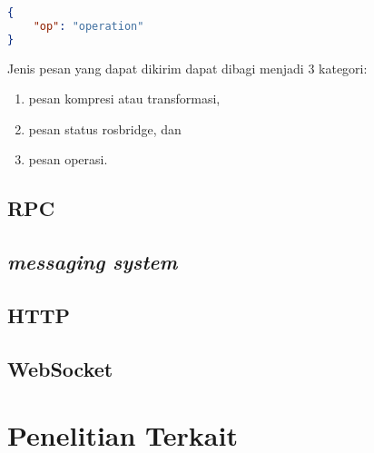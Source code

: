 \begin{lstlisting}[language=JSON, caption=contoh pesan valid pada lapisan transpor rosbridge]
{
    "op": "operation"
}
\end{lstlisting}

Jenis pesan yang dapat dikirim dapat dibagi menjadi 3 kategori:
\begin{enumerate}
    \item pesan kompresi atau transformasi,
    \item pesan status rosbridge, dan
    \item pesan operasi.
\end{enumerate}

\subsection{RPC}
\subsection{\textit{messaging system}}
\subsection{HTTP}
\subsection{WebSocket}

\section{Penelitian Terkait}
\blindtext


